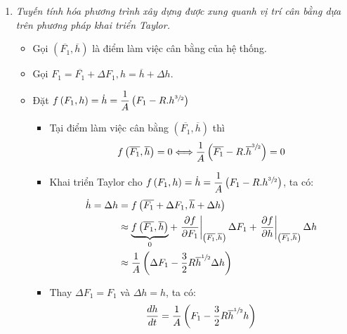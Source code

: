 \begin{enumerate}[\it a.]
        \item \textit{Tuyến tính hóa phương trình xây dựng được xung quanh vị trí cân bằng dựa trên phương pháp khai triển Taylor.}
            \begin{itemize}
                \item Gọi $\left({\overline{F_1}, \overline{h}}\right)$ là điểm làm việc cân bằng của hệ thống.

                \item Gọi $F_1 = \overline{F_1} + \Delta F_1, h = \overline{h} + \Delta h$.

                \item Đặt $f\left({F_1, h}\right) = \dot{h} = \dfrac{1}{A} \left({F_1 - R.h^{\sfrac{3}{2}}}\right)$
                    \begin{itemize}
                        \item Tại điểm làm việc cân bằng $\left({\overline{F_1}, \overline{h}}\right)$ thì
                            \begin{align}
                                f\left({\overline{F_1}, \overline{h}}\right) = 0 \Longleftrightarrow \dfrac{1}{A} \left({\overline{F_1} - R.\overline{h}^{\sfrac{3}{2}}}\right) = 0
                            \end{align}

                        \item Khai triển Taylor cho $f \left({F_1, h}\right) = \dot{h} = \dfrac{1}{A} \left({F_1 - R.h^{\sfrac{3}{2}}}\right)$, ta có:
                            \begin{align}
                                \dot{h} = \Delta h & = f\left({\overline{F_1} + \Delta F_1, \overline{h} + \Delta h}\right) \\
                                & \approx \underbrace{f \left({\overline{F_1}, \overline{h}}\right)}_{0} + \left.\dfrac{\partial f}{\partial F_1}\right|_{\left({\overline{F_1}, \overline{h}}\right)} \Delta F_1 + \left.\dfrac{\partial f}{\partial h}\right|_{\left({\overline{F_1}, \overline{h}}\right)} \Delta h\\
                                & \approx \dfrac{1}{A} \left({\Delta F_1 - \dfrac{3}{2} R \overline{h}^{\sfrac{1}{2}} \Delta h}\right)
                            \end{align}

                        \item Thay $\Delta F_1 = F_1$ và $\Delta h = h$, ta có:
                            \begin{align}
                                \dfrac{dh}{dt} = \dfrac{1}{A} \left({F_1 - \dfrac{3}{2} R \overline{h}^{\sfrac{1}{2}} h}\right)
                            \end{align}
                    \end{itemize}


\end{itemize}
\end{enumerate}
